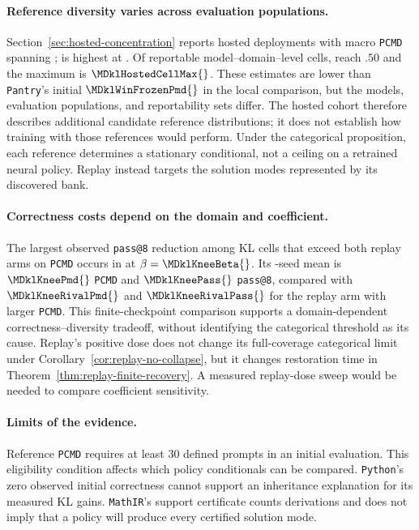 \documentclass{article}
\newcommand{\1}{\mathbf 1}
\newcommand{\pmd}{\texttt{PCMD}}
\theoremstyle{remark}
\theoremstyle{definition}
\theoremstyle{plain}
\begin{document}
\paragraph{Reference diversity varies across evaluation populations.}
Section~\ref{sec:hosted-concentration} reports \MDklHostedModels{}
hosted deployments with macro \pmd{} spanning \MDklHostedRange{};
\MDklHostedHiModel{} is highest at \MDklHostedHi{}. Of
\MDklHostedCells{} reportable model--domain--level cells,
\MDklHostedCellsHalf{} reach $.50$ and the maximum is
$\MDklHostedCellMax{}$. These estimates are lower than \texttt{Pantry}'s initial
$\MDklWinFrozenPmd{}$ in the local comparison, but the models,
evaluation populations, and reportability sets differ. The hosted cohort
therefore describes additional candidate reference distributions; it does
not establish how training with those references would perform. Under the
categorical proposition, each reference determines a stationary
conditional, not a ceiling on a retrained neural policy. Replay instead
targets the solution modes represented by its discovered bank.

\paragraph{Correctness costs depend on the domain and coefficient.}
The largest observed \texttt{pass@8} reduction among KL cells that exceed
both replay arms on \pmd{} occurs in \MDklKneeDomain{} at
$\beta=\MDklKneeBeta{}$. Its \MDklKneeSeeds{}-seed mean is
$\MDklKneePmd{}$ \pmd{} and $\MDklKneePass{}$ \texttt{pass@8},
compared with $\MDklKneeRivalPmd{}$ and $\MDklKneeRivalPass{}$ for
the replay arm with larger \pmd{}. This finite-checkpoint comparison
supports a domain-dependent correctness--diversity tradeoff, without
identifying the categorical threshold as its cause.
Replay's positive dose does not change its full-coverage categorical
limit under Corollary~\ref{cor:replay-no-collapse}, but it changes
restoration time in Theorem~\ref{thm:replay-finite-recovery}. A measured
replay-dose sweep would be needed to compare coefficient sensitivity.

\paragraph{Limits of the evidence.}
Reference \pmd{} requires at least 30 defined prompts in an initial
evaluation. This eligibility condition affects which policy conditionals
can be compared. \texttt{Python}'s zero observed initial correctness cannot
support an inheritance explanation for its measured KL gains.
\texttt{MathIR}'s support certificate counts derivations and does not imply
that a policy will produce every certified solution mode.
\end{document}
